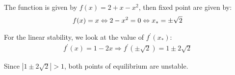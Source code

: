 \noindent The function is given by $f(x) = 2+x-x^2$, then fixed point are given by:
\begin{equation*}
  \begin{gathered}
    f(x) = x\Leftrightarrow 2-x^2 = 0\Leftrightarrow x_* = \pm\sqrt{2}
  \end{gathered}
\end{equation*}
\par\bigskip
\noindent For the linear stability, we look at the value of $f^{\prime}(x_*)$:
\begin{equation*}
  \begin{gathered}
    f^{\prime}(x) = 1-2x\Rightarrow f^{\prime}(\pm\sqrt{2}) = 1\pm2\sqrt{2}
  \end{gathered}
\end{equation*}\par
\noindent Since $\left|1\pm2\sqrt{2}\right|>1$, both points of equilibrium are unstable. 
